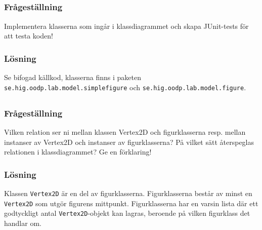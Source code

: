 \subsection{}\label{uppg1b}
\subsubsection*{Frågeställning}
Implementera klasserna som ingår i klassdiagrammet och skapa JUnit-tests för
att testa koden!

\subsubsection*{Lösning}
Se bifogad källkod, klasserna finns i paketen
\texttt{se.hig.oodp.lab.model.simplefigure} och
\texttt{se.hig.oodp.lab.model.figure}.



\subsection{}\label{uppg1c}
\subsubsection*{Frågeställning}
Vilken relation ser ni mellan klassen Vertex2D och figurklasserna resp. mellan
instanser av Vertex2D och instanser av figurklasserna? På vilket sätt 
återspeglas relationen i klassdiagrammet? Ge en förklaring!

\subsubsection*{Lösning}
Klassen \texttt{Vertex2D} är en del av figurklasserna. Figurklasserna består
av minst en \texttt{Vertex2D} som utgör figurens mittpunkt. Figurklasserna
har en varsin lista där ett godtyckligt antal \texttt{Vertex2D}-objekt kan
lagras, beroende på vilken figurklass det handlar om.





%

